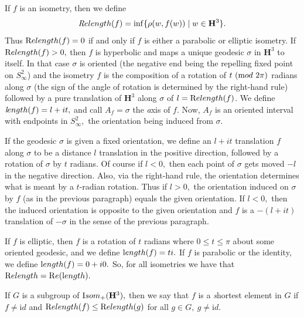  \begin{definition}
 If $f$ is an isometry, then we define
$${\textit Relength}(f)=\inf\{\rho(w,f(w))\mid w\in {\mathbf H}^3\}.$$
Thus ${\textrm Relength}(f)=0$ if and only if $f$ is either a parabolic or elliptic
isometry.  If ${\textrm Relength}(f) > 0,$ then $f$
is hyperbolic and maps a unique geodesic $\sigma$ in ${\mathbf H}^3$ to itself. In that case
$\sigma$ is oriented (the negative end
being the repelling fixed point on $S^2_\infty$)  and the isometry $f$ is the
composition of a  rotation of $t \ ({\textrm mod}\ 2\pi)$
radians along $\sigma$ (the sign of the angle of rotation is determined by the right-hand rule) followed by a pure translation of ${\mathbf H}^3$ along $\sigma$ of
$l = {\textrm Relength}(f)$.  We define
${\textit length}(f)=l+it,$ and call $A_f = \sigma$ the {\textit axis} of $f.$  Now,  $A_f$ is an oriented interval with endpoints in $S^2_{\infty},$ the
orientation being induced from $\sigma.$

If the geodesic $\sigma$ is  given a fixed orientation, we define an $l+it$
translation $f$ along $\sigma$  to be a distance $l$ translation in the positive
direction, followed by a rotation of $\sigma$ by $t$ radians.  Of course if
$l < 0,$ then each point of $\sigma$ gets moved $-l$ in the negative direction.
Also, via the right-hand rule, the orientation determines what is meant
by a $t$-radian rotation.  Thus if $l > 0,$ the orientation induced on
$\sigma$ by $f$ (as in the previous paragraph) equals the given orientation.
If $l < 0,$ then the induced orientation is opposite to the given orientation
and $f$ is a $-(l+it)$ translation of $-\sigma$ in the sense of the previous
paragraph.

If $f$ is elliptic, then $f$ is a rotation of $t$ radians where 
$0 \le t \le \pi$ about some oriented geodesic, and we define ${\textrm length}(f) = t i.$ 
If $f$ is parabolic or the identity, we define ${\textrm length}(f) = 0 + i0.$
So, for all isometries we have that ${\textrm Relength} = {\mathrm Re}({\textrm length}).$
\end{definition}

\begin{definition}   If
$G$ is a subgroup of ${\textrm Isom}_+({\mathbf H}^3),$ then  we say that $f$ is a {\textit shortest} element  in $G$ if $f\neq {\mathrm id}$ and
${\textrm Relength}(f)\le {\textrm Relength}(g)$
for all $g\in G, \ g\neq {\mathrm id}.$
\end{definition}
 
